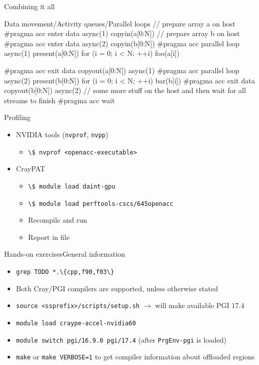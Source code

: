 \documentclass[12pt,aspectratio=169]{beamer}
\newcommand\shinline[2][]{\lstinline[style=shstyle,basicstyle=\ttfamily,#1]!#2!}
\begin{document}
\begin{frame}[fragile]{Combining it all}
  \begin{Cpplisting}{Data movement/Activity queues/Parallel loops}
// prepare array a on host
#pragma acc enter data async(1) copyin(a[0:N])
// prepare array b on host
#pragma acc enter data async(2) copyin(b[0:N])
#pragma acc parallel loop async(1) present(a[0:N])
for (i = 0; i < N: ++i)
    foo(a[i])

#pragma acc exit data copyout(a[0:N]) async(1)
#pragma acc parallel loop async(2) present(b[0:N])
for (i = 0; i < N; ++i)
    bar(b[i])
#pragma acc exit data copyout(b[0:N]) async(2)
// some more stuff on the host and then wait for all streams to finish
#pragma acc wait

  \end{Cpplisting}
\end{frame}

\begin{frame}[fragile]{Profiling}
  \begin{itemize}
  \item NVIDIA tools (\shinline{nvprof}, \shinline{nvpp})
    \begin{itemize}
    \item \shinline{\$ nvprof <openacc-executable>}
    \end{itemize}
    \vspace\baselineskip
  \item CrayPAT
    \begin{itemize}
    \item \shinline{\$ module load daint-gpu}
    \item \shinline{\$ module load perftools-cscs/645openacc}
    \item Recompile and run
    \item Report in  file
    \end{itemize}
  \end{itemize}
\end{frame}

\begin{frame}[fragile]{Hands-on exercises}{General information}
  \begin{itemize}
  \item \shinline{grep TODO *.\{cpp,f90,f03\}}
  \item Both Cray/PGI compilers are supported, unless otherwise stated
  \item \shinline{source <ssprefix>/scripts/setup.sh} $\rightarrow$ will make available PGI 17.4
  \item \shinline{module load craype-accel-nvidia60}
  \item \shinline{module switch pgi/16.9.0 pgi/17.4} (after \texttt{PrgEnv-pgi} is loaded)
  \item \shinline{make} or \shinline{make VERBOSE=1} to get compiler information about offloaded regions
  \end{itemize}
\end{frame}
\end{document}

